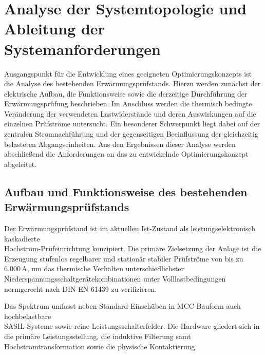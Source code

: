 \section{Analyse der Systemtopologie und Ableitung der Systemanforderungen}
\label{chap:ist_zustand}

Ausgangspunkt für die Entwicklung eines geeigneten Optimierungskonzepts ist die Analyse des bestehenden Erwärmungsprüfstands. Hierzu werden zunächst der elektrische Aufbau, die Funktionsweise sowie die derzeitige Durchführung der Erwärmungsprüfung beschrieben. Im Anschluss werden die thermisch bedingte Veränderung der verwendeten Lastwiderstände und deren Auswirkungen auf die einzelnen Prüfströme untersucht. Ein besonderer Schwerpunkt liegt dabei auf der zentralen Stromnachführung und der gegenseitigen Beeinflussung der gleichzeitig belasteten Abgangseinheiten. Aus den Ergebnissen dieser Analyse werden abschließend die Anforderungen an das zu entwickelnde Optimierungskonzept abgeleitet.

\subsection{Aufbau und Funktionsweise des bestehenden Erwärmungsprüfstands}
\label{sec:aufbau_ist_zustand}

Der Erwärmungsprüfstand ist im aktuellen Ist-Zustand als leistungselektronisch kaskadierte \\Hochstrom-Prüfeinrichtung konzipiert. Die primäre Zielsetzung der Anlage ist die Erzeugung stufenlos regelbarer und stationär stabiler Prüfströme von bis zu $6.000\,\text{A}$, um das thermische Verhalten unterschiedlichster Nieder\-spannungs\-schalt\-geräte\-kombinationen unter Volllastbedingungen normgerecht nach DIN EN 61439 zu verifizieren. 

Das Spektrum umfasst neben Standard-Einschüben in MCC-Bauform auch hochbelastbare \\SASIL-Systeme sowie reine Leistungsschalterfelder. Die Hardware gliedert sich in die primäre Leistungsstellung, die induktive Filterung samt Hochstromtransformation sowie die physische Kontaktierung.

